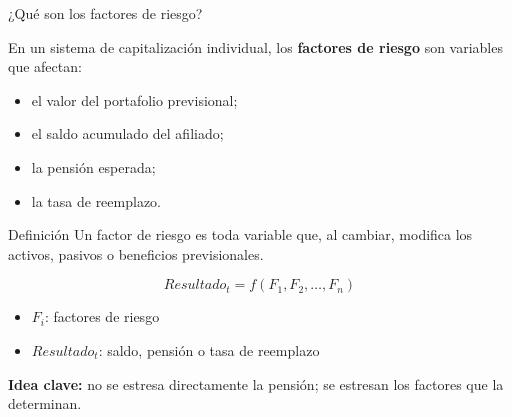 \documentclass[10pt,aspectratio=169]{beamer}
\begin{document}
\begin{frame}{¿Qué son los factores de riesgo?}

En un sistema de capitalización individual, los \textbf{factores de riesgo} son variables que afectan:

\begin{itemize}
    \item el valor del portafolio previsional;
    \item el saldo acumulado del afiliado;
    \item la pensión esperada;
    \item la tasa de reemplazo.
\end{itemize}


\begin{block}{Definición}
Un factor de riesgo es toda variable que, al cambiar, modifica los activos, pasivos o beneficios previsionales.
\end{block}


\[
Resultado_t = f(F_1, F_2, \ldots, F_n)
\]

\begin{itemize}
    \item $F_i$: factores de riesgo
    \item $Resultado_t$: saldo, pensión o tasa de reemplazo
\end{itemize}


\textbf{Idea clave:} no se estresa directamente la pensión; se estresan los factores que la determinan.

\end{frame}
\end{document}
